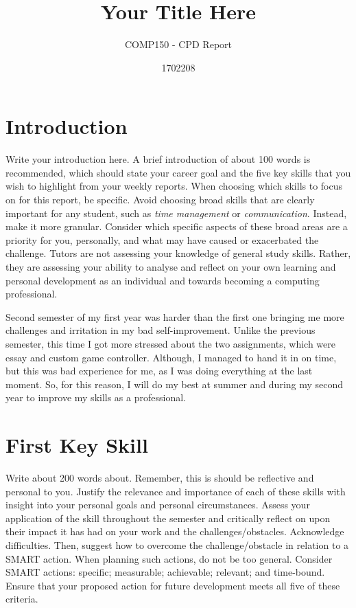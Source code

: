 \documentclass{scrartcl}
\title{Your Title Here}
\subtitle{COMP150 - CPD Report}
\author{1702208}
\begin{document}
\maketitle

\section{Introduction}

Write your introduction here. A brief introduction of about 100 words is recommended, which should state your career goal and the five key skills that you wish to highlight from your weekly reports. When choosing which skills to focus on for this report, be specific. Avoid choosing broad skills that are clearly important for any student, such as \textit{time management} or \textit{communication}. Instead, make it more granular. Consider which specific aspects of these broad areas are a priority for you, personally, and what may have caused or exacerbated the challenge. Tutors are not assessing your knowledge of general study skills. Rather, they are assessing your ability to analyse and reflect on your own learning and personal development as an individual and towards becoming a computing professional.

Second semester of my first year was harder than the first one bringing me more challenges and irritation in my bad self-improvement. Unlike the previous semester, this time I got more stressed about the two assignments, which were essay and custom game controller. Although, I managed to hand it in on time, but this was bad experience for me, as I was doing everything at the last moment. So, for this reason, I will do my best at summer and during my second year to improve my skills as a professional.

\section{First Key Skill}

Write about 200 words about. Remember, this is should be reflective and personal to you. Justify the relevance and importance of each of these skills with insight into your personal goals and personal circumstances. Assess your application of the skill throughout the semester and critically reflect on upon their impact it has had on your work and the challenges/obstacles. Acknowledge difficulties. Then, suggest how to overcome the challenge/obstacle in relation to a SMART action. When planning such actions, do not be too general. Consider SMART actions:
specific; measurable; achievable; relevant; and time-bound. Ensure that your proposed action for future development meets all five of these criteria.
\end{document}
